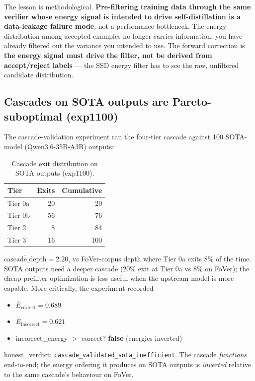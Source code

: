 \documentclass[10pt]{article}
\begin{document}
The lesson is methodological. \textbf{Pre-filtering training data
through the same verifier whose energy signal is intended to drive
self-distillation is a data-leakage failure mode}, not a performance
bottleneck. The energy distribution among accepted examples no
longer carries information; you have already filtered out the
variance you intended to use. The forward correction is \textbf{the
energy signal must drive the filter, not be derived from
accept/reject labels} --- the SSD energy filter has to see the raw,
unfiltered candidate distribution.

\subsection{Cascades on SOTA outputs are Pareto-suboptimal (exp1100)}
\label{sec:exp1100}

The cascade-validation experiment ran the four-tier cascade against
100 SOTA-model (Qwen3.6-35B-A3B) outputs:

\begin{table}[ht]
  \centering
  \begin{tabular}{lrr}
    \toprule
    Tier & Exits & Cumulative \\
    \midrule
    Tier 0a & 20 & 20 \\
    Tier 0b & 56 & 76 \\
    Tier 2 & 8 & 84 \\
    Tier 3 & 16 & 100 \\
    \bottomrule
  \end{tabular}
  \caption{Cascade exit distribution on SOTA outputs (exp1100).}
  \label{tab:exp1100}
\end{table}

$\overline{\text{cascade\_depth}} = 2.20$, vs FoVer-corpus depth
where Tier 0a exits 8\% of the time. SOTA outputs need a deeper
cascade (20\% exit at Tier 0a vs 8\% on FoVer); the cheap-prefilter
optimization is less useful when the upstream model is more capable.
More critically, the experiment recorded
\begin{itemize}
  \item $\overline{E}_{\mathrm{correct}} = 0.689$
  \item $\overline{E}_{\mathrm{incorrect}} = 0.621$
  \item incorrect\_energy $>$ correct? \textbf{false} (energies inverted)
\end{itemize}

honest\_verdict: \texttt{cascade\_validated\_sota\_inefficient}.
The cascade \emph{functions} end-to-end; the energy ordering it
produces on SOTA outputs is \emph{inverted} relative to the same
cascade's behaviour on FoVer.
\end{document}
